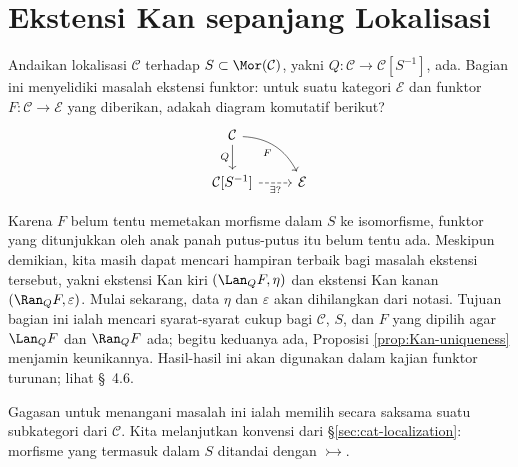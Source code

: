 
\section{Ekstensi Kan sepanjang Lokalisasi}\label{sec:functor-localization}
\hypertarget{o014.aljabr2.chapter1.kan-extensions-along-localization}{ }

Andaikan lokalisasi $\mathcal{C}$ terhadap
$S \subset \Mor(\mathcal{C})$, yakni
$Q: \mathcal{C} \to \mathcal{C}[S^{-1}]$, ada. Bagian ini
menyelidiki masalah ekstensi funktor: untuk suatu kategori $\mathcal{E}$ dan
funktor $F: \mathcal{C} \to \mathcal{E}$ yang diberikan, adakah diagram
komutatif berikut?
\[\begin{tikzcd}
	\mathcal{C} \arrow[d, "Q"'] \arrow[rd, bend left, "F"'] & \\
	\mathcal{C}{[S^{-1}]} \arrow[dashed, r, "\exists? "'] & \mathcal{E}
\end{tikzcd}\]

Karena $F$ belum tentu memetakan morfisme dalam $S$ ke isomorfisme, funktor
yang ditunjukkan oleh anak panah putus-putus itu belum tentu ada. Meskipun
demikian, kita masih dapat mencari hampiran terbaik bagi masalah ekstensi
tersebut, yakni ekstensi Kan kiri $(\Lan_Q F, \eta)$ dan ekstensi Kan kanan
$(\Ran_Q F, \varepsilon)$. Mulai sekarang, data $\eta$ dan $\varepsilon$ akan
dihilangkan dari notasi. Tujuan bagian ini ialah mencari syarat-syarat cukup
bagi $\mathcal{C}$, $S$, dan $F$ yang dipilih agar $\Lan_Q F$ dan $\Ran_Q F$
ada; begitu keduanya ada, Proposisi \ref{prop:Kan-uniqueness} menjamin
keunikannya. Hasil-hasil ini akan digunakan dalam kajian funktor turunan;
lihat \S~4.6.

Gagasan untuk menangani masalah ini ialah memilih secara saksama suatu
subkategori dari $\mathcal{C}$. Kita melanjutkan konvensi dari
\S\ref{sec:cat-localization}: morfisme yang termasuk dalam $S$ ditandai
dengan $\rightarrowtail$.

